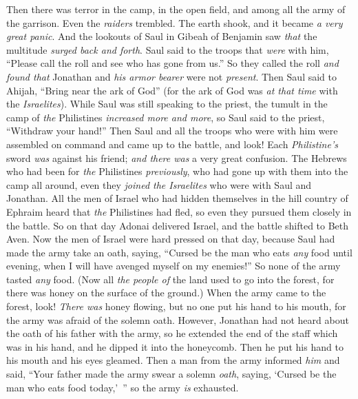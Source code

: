 \begin{biblechapter}
\verse Then there was terror in the camp, in the open field, and among all the army of the garrison. Even the \textit{raiders} trembled. The earth shook, and it became \textit{a very great panic}.
\verse And the lookouts of Saul in Gibeah of Benjamin saw \textit{that} the multitude \textit{surged back and forth}.
\verse Saul said to the troops that \textit{were} with him, “Please call the roll and see who has gone from us.” So they called the roll \textit{and found that} Jonathan and \textit{his armor bearer} were not \textit{present}.
\verse Then Saul said to Ahijah, “Bring near the ark of God” (for the ark of God was \textit{at that time} with the \textit{Israelites}).
\verse While Saul was still speaking to the priest, the tumult in the camp of \textit{the} Philistines \textit{increased more and more}, so Saul said to the priest, “Withdraw your hand!”
\verse Then Saul and all the troops who were with him were assembled on command and came up to the battle, and look! Each \textit{Philistine’s} sword \textit{was} against his friend; \textit{and there was} a very great confusion.
\verse The Hebrews who had been for \textit{the} Philistines \textit{previously}, who had gone up with them into the camp all around, even they \textit{joined the Israelites} who were with Saul and Jonathan.
\verse All the men of Israel who had hidden themselves in the hill country of Ephraim heard that \textit{the} Philistines had fled, so even they pursued them closely in the battle.
\verse So on that day Adonai delivered Israel, and the battle shifted to Beth Aven.
 Now the men of Israel were hard pressed on that day, because Saul had made the army take an oath, saying, “Cursed be the man who eats \textit{any} food until evening, when I will have avenged myself on my enemies!” So none of the army tasted \textit{any} food.
\verse (Now all \textit{the people of} the land used to go into the forest, for there was honey on the surface of the ground.)
\verse When the army came to the forest, look! \textit{There was} honey flowing, but no one put his hand to his mouth, for the army was afraid of the solemn oath.
\verse However, Jonathan had not heard about the oath of his father with the army, so he extended the end of the staff which was in his hand, and he dipped it into the honeycomb. Then he put his hand to his mouth and his eyes gleamed.
\verse Then a man from the army informed \textit{him} and said, “Your father made the army swear a solemn \textit{oath}, saying, ‘Cursed be the man who eats food today,’ ” so the army \textit{is} exhausted.

\end{biblechapter}

